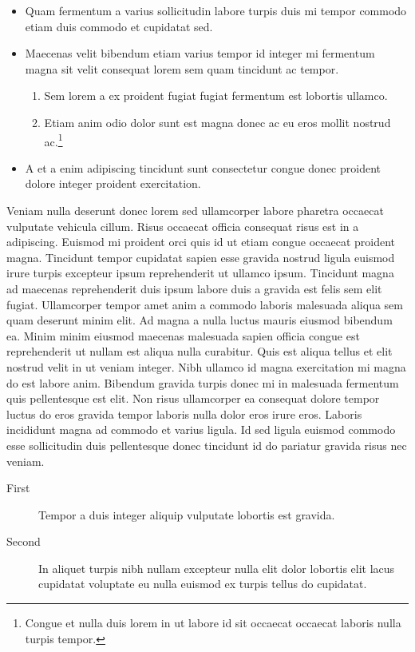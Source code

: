 \documentclass[11pt,a4paper]{article}
\begin{document}
\begin{itemize}
  \item Quam fermentum a varius sollicitudin labore turpis duis mi tempor commodo etiam duis commodo et cupidatat sed.
  \item Maecenas velit bibendum etiam varius tempor id integer mi fermentum magna sit velit consequat lorem sem quam tincidunt ac tempor.
  \begin{enumerate}
    \item Sem lorem a ex proident fugiat fugiat fermentum est lobortis ullamco.
    \item Etiam anim odio dolor sunt est magna donec ac eu eros mollit nostrud ac.\footnote{Congue et nulla duis lorem in ut labore id sit occaecat occaecat laboris nulla turpis tempor.}
  \end{enumerate}
  \item A et a enim adipiscing tincidunt sunt consectetur congue donec proident dolore integer proident exercitation.
\end{itemize}

Veniam nulla deserunt donec lorem sed ullamcorper labore pharetra
occaecat vulputate vehicula cillum. Risus occaecat officia consequat
risus est in a adipiscing. Euismod mi proident orci quis id ut etiam
congue occaecat proident magna. Tincidunt tempor cupidatat sapien esse
gravida nostrud ligula euismod irure turpis excepteur ipsum
reprehenderit ut ullamco ipsum. Tincidunt magna ad maecenas
reprehenderit duis ipsum labore duis a gravida est felis sem elit
fugiat. Ullamcorper tempor amet anim a commodo laboris malesuada aliqua
sem quam deserunt minim elit. Ad magna a nulla luctus mauris eiusmod
bibendum ea. Minim minim eiusmod maecenas malesuada sapien officia
congue est reprehenderit ut nullam est aliqua nulla curabitur. Quis est
aliqua tellus et elit nostrud velit in ut veniam integer. Nibh ullamco
id magna exercitation mi magna do est labore anim. Bibendum gravida
turpis donec mi in malesuada fermentum quis pellentesque est elit. Non
risus ullamcorper ea consequat dolore tempor luctus do eros gravida
tempor laboris nulla dolor eros irure eros. Laboris incididunt magna ad
commodo et varius ligula. Id sed ligula euismod commodo esse
sollicitudin duis pellentesque donec tincidunt id do pariatur gravida
risus nec veniam.

\begin{description}
  \item[First] Tempor a duis integer aliquip vulputate lobortis est gravida.
  \item[Second] In aliquet turpis nibh nullam excepteur nulla elit dolor lobortis elit lacus cupidatat voluptate eu nulla euismod ex turpis tellus do cupidatat.
\end{description}
\end{document}
